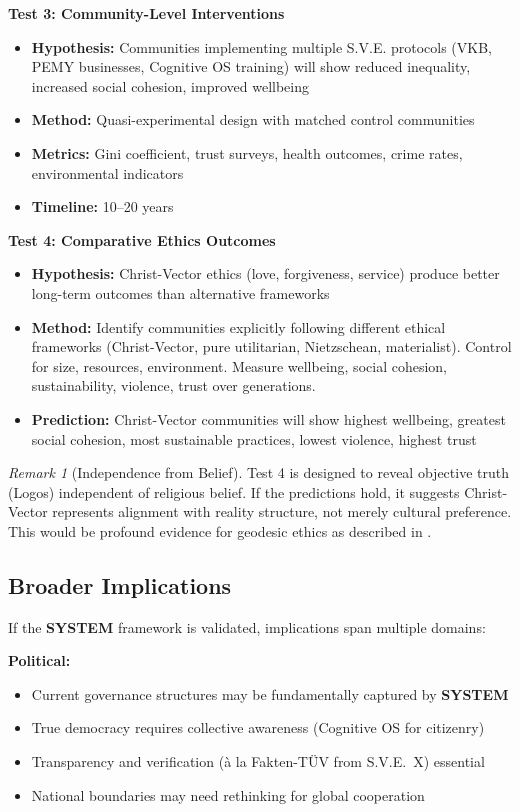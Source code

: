\documentclass[11pt,a4paper]{article}
\newcommand{\SYSTEM}{\textbf{SYSTEM}}
\theoremstyle{definition}
\theoremstyle{remark}
\newtheorem{remark}{Remark}[section]
\begin{document}
\textbf{Test 3: Community-Level Interventions}
\begin{itemize}
    \item \textbf{Hypothesis:} Communities implementing multiple S.V.E. protocols (VKB, PEMY businesses, Cognitive OS training) will show reduced inequality, increased social cohesion, improved wellbeing
    \item \textbf{Method:} Quasi-experimental design with matched control communities
    \item \textbf{Metrics:} Gini coefficient, trust surveys, health outcomes, crime rates, environmental indicators
    \item \textbf{Timeline:} 10--20 years
\end{itemize}

\textbf{Test 4: Comparative Ethics Outcomes}
\begin{itemize}
    \item \textbf{Hypothesis:} Christ-Vector ethics (love, forgiveness, service) produce better long-term outcomes than alternative frameworks
    \item \textbf{Method:} Identify communities explicitly following different ethical frameworks (Christ-Vector, pure utilitarian, Nietzschean, materialist). Control for size, resources, environment. Measure wellbeing, social cohesion, sustainability, violence, trust over generations.
    \item \textbf{Prediction:} Christ-Vector communities will show highest wellbeing, greatest social cohesion, most sustainable practices, lowest violence, highest trust
\end{itemize}

\begin{remark}[Independence from Belief]
Test 4 is designed to reveal objective truth (Logos) independent of religious belief. If the predictions hold, it suggests Christ-Vector represents alignment with reality structure, not merely cultural preference. This would be profound evidence for geodesic ethics as described in \cite{sve4,sve8}.
\end{remark}

\subsection{Broader Implications}

If the \SYSTEM{} framework is validated, implications span multiple domains:

\textbf{Political:}
\begin{itemize}
    \item Current governance structures may be fundamentally captured by \SYSTEM{}
    \item True democracy requires collective awareness (Cognitive OS for citizenry)
    \item Transparency and verification (à la Fakten-TÜV from S.V.E.~X) essential
    \item National boundaries may need rethinking for global cooperation
\end{itemize}
\end{document}
